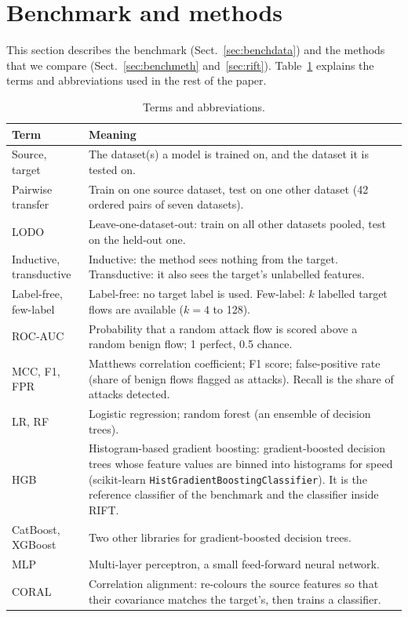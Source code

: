 \documentclass[pdflatex,sn-mathphys-num]{sn-jnl}%
\begin{document}
\section{Benchmark and methods}\label{sec:bench}
This section describes the benchmark (Sect.~\ref{sec:benchdata}) and the methods that we compare (Sect.~\ref{sec:benchmeth} and~\ref{sec:rift}).
Table~\ref{tab:terms} explains the terms and abbreviations used in the rest of the paper.

\begin{table}[htbp]
\centering\small
\caption{Terms and abbreviations.}\label{tab:terms}
\begin{tabular}{p{}p{}}
\toprule
Term & Meaning \\
\midrule
Source, target & The dataset(s) a model is trained on, and the dataset it is tested on. \\
Pairwise transfer & Train on one source dataset, test on one other dataset (42 ordered pairs of seven datasets). \\
LODO & Leave-one-dataset-out: train on all other datasets pooled, test on the held-out one. \\
Inductive, transductive & Inductive: the method sees nothing from the target. Transductive: it also sees the target's unlabelled features. \\
Label-free, few-label & Label-free: no target label is used. Few-label: $k$ labelled target flows are available ($k=4$ to 128). \\
ROC-AUC & Probability that a random attack flow is scored above a random benign flow; 1 perfect, 0.5 chance. \\
MCC, F1, FPR & Matthews correlation coefficient; F1 score; false-positive rate (share of benign flows flagged as attacks). Recall is the share of attacks detected. \\
LR, RF & Logistic regression; random forest (an ensemble of decision trees). \\
HGB & Histogram-based gradient boosting: gradient-boosted decision trees whose feature values are binned into histograms for speed (scikit-learn \texttt{HistGradientBoostingClassifier}). It is the reference classifier of the benchmark and the classifier inside RIFT. \\
CatBoost, XGBoost & Two other libraries for gradient-boosted decision trees. \\
MLP & Multi-layer perceptron, a small feed-forward neural network. \\
CORAL & Correlation alignment: re-colours the source features so that their covariance matches the target's, then trains a classifier. \\

\end{tabular}
\end{table}
\end{document}
